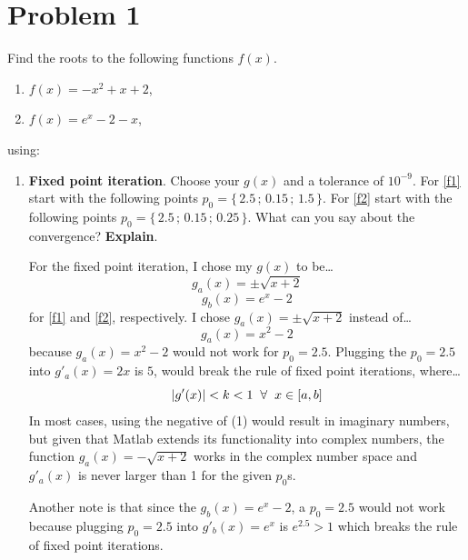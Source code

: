 \documentclass[12pt,letterpaper]{article}
\begin{document}
\newcommand{\norm}[1]{\left\lVert#1\right\rVert}

\section*{Problem 1}
Find the roots to the following functions $f(x)$.
\begin{enumerate}[label=(\alph*)]
	\item \label{f1} $f(x) = -x^2 +x + 2$,
	\item \label{f2} $f(x) = e^x -2 - x$,	
\end{enumerate}

using:

\begin{enumerate}
	\item \textbf{Fixed point iteration}. Choose your $g(x)$ and a tolerance of $10^{-9}$. For \ref{f1} start with the following points $p_0 =\{\,2.5\,;\,0.15\,;\,1.5\,\}$. For \ref{f2} start with the following points $p_0 =\{\,2.5\,; \,0.15\,;\, 0.25\,\}$. What can you say about the convergence? \textbf{Explain}.
	
    For the fixed point iteration, I chose my $g(x)$ to be\ldots
\begin{equation}
    g_{a}(x) = \pm \sqrt{x+2}
\end{equation}
\begin{equation}
    g_{b}(x) = e^{x}-2
\end{equation}
    for \ref{f1} and \ref{f2}, respectively. I chose $g_{a}(x) = \pm \sqrt{x+2}$ instead of\ldots
\begin{equation}
    g_{a}(x) = x^{2}-2
\end{equation}
    because $g_{a}(x) = x^{2}-2$ would not work for $p_{0} = 2.5$. Plugging the $p_{0}=2.5$ into $g'_{a}(x)=2x$ is $5$, would break the rule of fixed point iterations, where\ldots
\begin{equation}
    \left\lvert g'(x) \right\rvert  < k < 1 \hspace*{.2cm}\forall \hspace*{.2cm} x \in \left[a,b\right] 
\end{equation}
In most cases, using the negative of (1) would result in imaginary numbers, but given that Matlab extends its functionality into complex numbers, the function $g_{a}(x) = - \sqrt{x+2}$ works in the complex number space and $g'_{a}(x)$ is never larger than 1 for the given $p_{0}$s.


Another note is that since the $g_{b}(x) = e^{x}-2$, a $p_{0}=2.5$ would not work because plugging $p_{0}=2.5$ into $g'_{b}(x)=e^{x}$ is $e^{2.5}>1$ which breaks the rule of fixed point iterations.



\end{enumerate}
\end{document}
